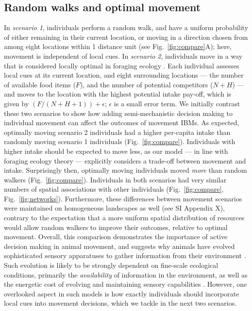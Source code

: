 \subsection*{Random walks and optimal movement}

In \textit{scenario 1}, individuals perform a random walk, and have a uniform probability of either remaining in their current location, or moving in a direction chosen from among eight locations within 1 distance unit (see Fig.~\ref{fig:compare}A); here, movement is independent of local cues.
In \textit{scenario 2}, individuals move in a way that is considered locally optimal in foraging ecology \citep{stephens2019,scherer2020}.
Each individual assesses local cues at its current location, and eight surrounding locations --- the number of available food items ($F$), and the number of potential competitors ($N + H$) --- and moves to the location with the highest potential intake pay-off, which is given by $(F / (N + H + 1)) + \epsilon$; $\epsilon$ is a small error term.
We initially contrast these two scenarios to show how adding semi-mechanistic decision making to individual movement can affect the outcomes of movement IBMs.
As expected, optimally moving scenario 2 individuals had a higher per-capita intake than randomly moving scenario 1 individuals (Fig.~\ref{fig:compare}).
Individuals with higher intake should be expected to move less, as our model --- in line with foraging ecology theory \citep{charnov1976} --- explicitly considers a trade-off between movement and intake.
Surprisingly then, optimally moving individuals moved \textit{more} than random walkers (Fig.~\ref{fig:compare}).
Individuals in both scenarios had very similar numbers of spatial associations with other individuals (Fig.~\ref{fig:compare}, Fig.~\ref{fig:networks}).
Furthermore, these differences between movement scenarios were maintained on homogeneous landscapes as well (see SI Appendix X), contrary to the expectation that a more uniform spatial distribution of resources would allow random walkers to improve their outcomes, relative to optimal movement.
Overall, this comparison demonstrates the importance of active decision making in animal movement, and suggests why animals have evolved sophisticated sensory apparatuses to gather information from their environment \citep{avgar2013,berger2022,mann2021,swain2021}.
Such evolution is likely to be strongly dependent on fine-scale ecological conditions, primarily the \textit{availability} of information in the environment, as well as the energetic cost of evolving and maintaining sensory capabilities \citep{swain2021}.
However, one overlooked aspect in such models is how exactly individuals should incorporate local cues into movement decisions, which we tackle in the next two scenarios.

